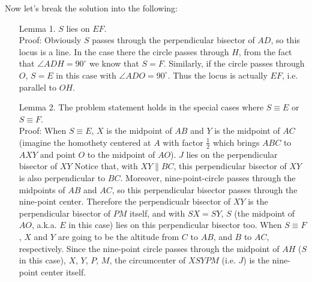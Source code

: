 \documentclass[11pt,a4paper]{article}
\begin{document}
\begin{itemize}
Now let's break the solution into the following:
\begin{itemize}
\item [Lemma 1.]  $S$ lies on $EF$.\\
Proof: 
Obviously $S$ passes through the perpendicular bisector of $AD$, so this locus is a line. 
In the case there the circle passes through $H$, from the fact that $\angle ADH=90^{\circ}$ we know that $S=F$.
Similarly, if the circle passes through $O$, $S=E$ in this case with $\angle ADO=90^{\circ}$. 
Thus the locus is actually $EF$, i.e. parallel to $OH$. 
\item [Lemma 2.] The problem statement holds in the special cases where $S\equiv E$ or $S\equiv F$.\\
Proof:
When $S\equiv E$, $X$ is the midpoint of $AB$ and $Y$ is the midpoint of $AC$ (imagine the homothety centered at $A$ with factor $\frac 12$ which brings $ABC$ to $AXY$ and point $O$ to the midpoint of $AO$). 
$J$ lies on the perpendicular bisector of $XY$
Notice that, with $XY\parallel BC$, this perpendicular bisector of $XY$ is also perpendicular to $BC$. 
Moreover, nine-point-circle passes through the midpoints of $AB$ and $AC$, so this perpendicular bisector passes through the nine-point center. 
Therefore the perpendicualr bisector of $XY$ is the perpendicular bisector of $PM$ itself, 
and with $SX=SY$, $S$ (the midpoint of $AO$, a.k.a. $E$ in this case) lies on this perpendicular bisector too. 
When $S\equiv F$, $X$ and $Y$ are going to be the altitude from $C$ to $AB$, and $B$ to $AC$, respectively. 
Since the nine-point circle passes through the midpoint of $AH$ ($S$ in this case), $X$, $Y$, $P$, $M$, 
 the circumcenter of $XSYPM$ (i.e. $J$) is the nine-point center itself. 
\end{itemize}


\end{itemize}
\end{document}
